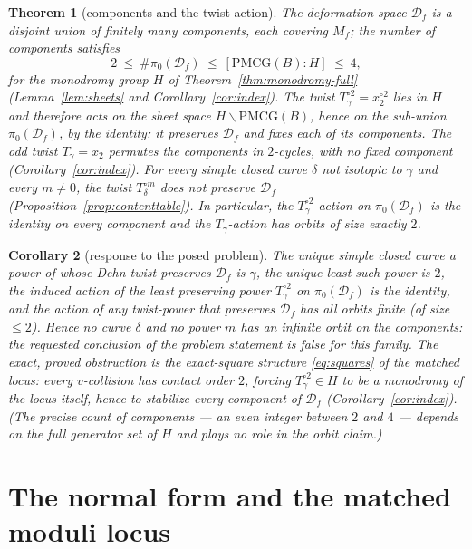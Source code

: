 \documentclass[11pt]{article}
\newtheorem{theorem}{Theorem}[section]
\newtheorem{corollary}[theorem]{Corollary}
\theoremstyle{definition}
\theoremstyle{remark}
\newcommand{\PMCG}{\mathrm{PMCG}}
\newcommand{\Df}{\mathcal D_f}
\begin{document}
\begin{theorem}[components and the twist action]\label{thm:components}
The deformation space $\Df$ is a disjoint union of finitely many
components, each covering $M_f$; the number of components satisfies
\[
2\ \le\ \#\pi_0(\Df)\ \le\ [\PMCG(B):H]\ \le\ 4,
\]
for the monodromy group $H$ of
Theorem~\ref{thm:monodromy-full} \textup{(}Lemma~\ref{lem:sheets}
and Corollary~\ref{cor:index}\textup{)}.  The twist
$T_\gamma^{\circ2}=x_2^{\circ2}$ lies in $H$ and therefore acts on the
sheet space $H\backslash\PMCG(B)$, hence on the sub-union
$\pi_0(\Df)$, by the identity: it preserves $\Df$ and fixes each of
its components.  The odd twist $T_\gamma=x_2$ permutes the components
in $2$-cycles, with no fixed component
\textup{(}Corollary~\ref{cor:index}\textup{)}.  For every simple closed
curve $\delta$ not isotopic to $\gamma$ and every $m\neq0$, the twist
$T_\delta^{\circ m}$ does not preserve $\Df$
\textup{(}Proposition~\ref{prop:contenttable}\textup{)}.  In
particular, the $T_\gamma^{\circ2}$-action on $\pi_0(\Df)$ is the
identity on every component and the $T_\gamma$-action has orbits of
size exactly $2$.
\end{theorem}

\begin{corollary}[response to the posed problem]\label{cor:answer}
The unique simple closed curve a power of whose Dehn twist preserves
$\Df$ is $\gamma$, the unique least such power is $2$, the induced
action of the least preserving power $T_\gamma^{\circ2}$ on
$\pi_0(\Df)$ is the identity, and the action of any twist-power that
preserves $\Df$ has all orbits finite \textup{(}of size $\le2$\textup{)}.
Hence \emph{no curve $\delta$ and no power $m$ has an infinite orbit on
the components}: the requested conclusion of the problem statement is
\emph{false for this family}.  The exact, proved obstruction is the
exact-square structure \eqref{eq:squares} of the matched locus: every
$v$-collision has contact order $2$, forcing
$T_\gamma^{\circ2}\in H$ to be a monodromy of the locus itself, hence
to stabilize every component of $\Df$
\textup{(}Corollary~\ref{cor:index}\textup{)}.  \textup{(}The precise
count of components — an even integer between $2$ and $4$ — depends on
the full generator set of $H$ and plays no role in the orbit
claim.\textup{)}
\end{corollary}

\section{The normal form and the matched moduli locus}\label{sec:mf}
\end{document}
